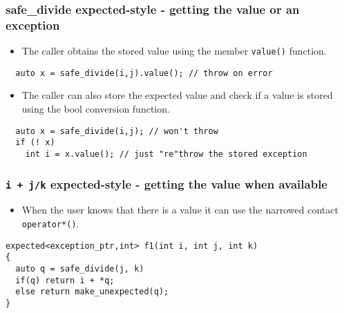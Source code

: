 \documentclass[xcolor=dvipsnames]{beamer}
\newcommand{\cpp}[1]{\lstinline{#1}}
\begin{document}
\begin{frame}[fragile]
\frametitle{safe\_divide expected-style  - getting the value or an exception}

\begin{itemize}
  \item The caller obtains the stored value using the member \cpp{value()} function.
\end{itemize}

\begin{lstlisting}
  auto x = safe_divide(i,j).value(); // throw on error
\end{lstlisting}

\begin{itemize}
  \item The caller can also store the expected value and check if a value is stored using the bool conversion  function.
\end{itemize}

\begin{lstlisting}
  auto x = safe_divide(i,j); // won't throw
  if (! x) 
    int i = x.value(); // just "re"throw the stored exception
\end{lstlisting}

\end{frame}
\begin{frame}[fragile]
\frametitle{\cpp{i + j/k} expected-style  - getting the value when available}

\begin{itemize}
  \item When the user knows that there is a value it can use the narrowed contact \cpp{operator*()}.
\end{itemize}

\begin{lstlisting}
expected<exception_ptr,int> f1(int i, int j, int k)
{
  auto q = safe_divide(j, k)
  if(q) return i + *q;
  else return make_unexpected(q);
}
\end{lstlisting}

\end{frame}
\end{document}
